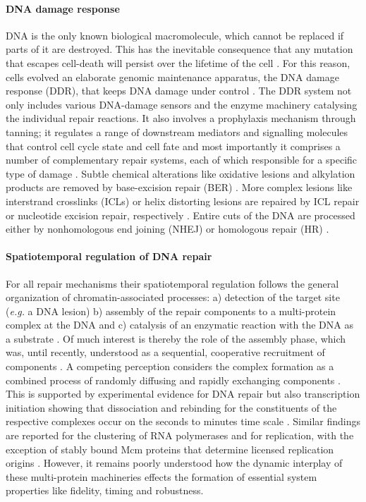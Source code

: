 \paragraph{DNA damage response}    
DNA is the only known biological macromolecule, which cannot be replaced if parts of it are destroyed. This has the inevitable consequence that any mutation that escapes cell-death will persist over the lifetime of the cell \cite{Hoeijmakers2009,Marteijn2014}. For this reason, cells evolved an elaborate genomic maintenance apparatus, the DNA damage response (DDR), that keeps DNA damage under control \cite{Ciccia2010}. The DDR system not only includes various DNA-damage sensors and the enzyme machinery catalysing the individual repair reactions. It also  involves a prophylaxis mechanism through tanning; it regulates a range of downstream mediators and signalling molecules that control cell cycle state and cell fate and most importantly it comprises a number of complementary repair systems, each of which responsible for a specific type of damage \cite{Ciccia2010,Marteijn2014}. Subtle chemical alterations like oxidative lesions and alkylation products are removed by base-excision repair (BER) \cite{Lindahl2000,Caldecott2008}. More complex lesions like interstrand crosslinks (ICLs) or helix distorting lesions are repaired by ICL repair or nucleotide excision repair, respectively \cite{Moldovan2009,Hoeijmakers2009}. Entire cuts of the DNA are processed either by nonhomologous end joining (NHEJ) or homologous repair (HR) \cite{Caldecott2008,West2003}. 

\paragraph{Spatiotemporal regulation of DNA repair} For all repair mechanisms their spatiotemporal regulation follows the general organization of chromatin-associated processes: a) detection of the target site (\textit{e.g.} a DNA lesion) b) assembly of the repair components to a multi-protein complex at the DNA and c) catalysis of an enzymatic reaction with the DNA as a substrate \cite{Hoeijmakers:2001:Nature:11357144,Gillet:2006:Chem-Rev:16464005,Dinant:2009:J-Cell-Biol:19332890,Luijsterburg2010}. Of much interest is thereby the role of the assembly phase, which was, until recently, understood as a sequential, cooperative recruitment of components \cite{Volker2001}. A competing perception considers the complex formation as a combined process of randomly diffusing and rapidly exchanging components \cite{Luijsterburg2010}. This is supported by experimental evidence for DNA repair but also transcription initiation showing that dissociation and rebinding for the constituents of the respective complexes occur on the seconds to minutes time scale \cite{Vermeulen2011,Stasevich2011}. Similar findings are reported for the clustering of RNA polymerases and for replication, with the exception of stably bound Mcm proteins that determine licensed replication origins \cite{Kuipers2011,Sonneville2012}. However, it remains poorly understood how the dynamic interplay of these multi-protein machineries effects the formation of essential system properties like fidelity, timing and robustness. 




